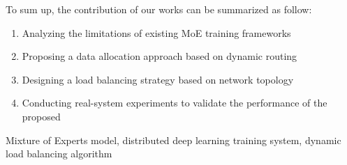 \noindent To sum up, the contribution of our works can be summarized as follow:
\vspace{-12pt}
\begin{enumerate} \setlength{\itemsep}{0pt}
    \item Analyzing the limitations of existing MoE training frameworks
\item Proposing a data allocation approach based on dynamic routing
\item Designing a load balancing strategy based on network topology
\item Conducting real-system experiments to validate the performance of the proposed 
\end{enumerate}
\vspace{-12pt}


\vspace{1em}
 \quad Mixture of Experts model, distributed deep learning training system, dynamic load balancing algorithm

\clearpage
\endinput